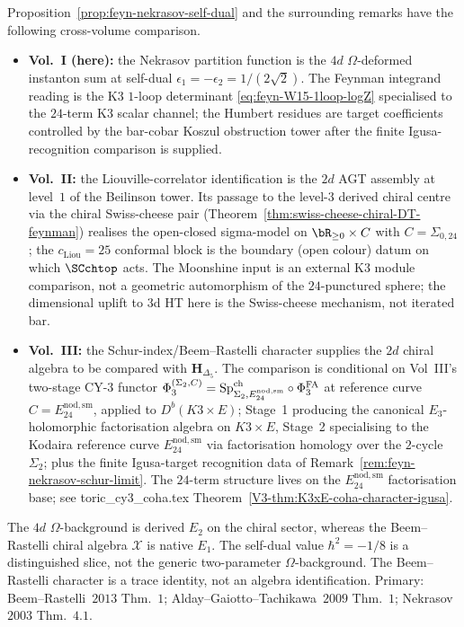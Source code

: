 \begin{remark}
\label{rem:feyn-nekrasov-cross-volume-comparison}
Proposition~\ref{prop:feyn-nekrasov-self-dual} and the
surrounding remarks have the following cross-volume comparison.
\begin{itemize}
\item \textbf{Vol.~I (here):} the Nekrasov partition function
is the $4d$ $\Omega$-deformed instanton sum at self-dual
$\epsilon_1 = -\epsilon_2 = 1/(2\sqrt 2)$. The Feynman
integrand reading is the K3 $1$-loop determinant
\eqref{eq:feyn-W15-1loop-logZ} specialised to the
$24$-term K3 scalar channel; the Humbert residues are target
coefficients controlled by the bar-cobar Koszul obstruction tower
after the finite Igusa-recognition comparison is supplied.
\item \textbf{Vol.~II:} the Liouville-correlator identification is
the $2d$ AGT assembly at level~$1$ of the Beilinson tower.
Its passage to the level-$3$ derived chiral centre via the
chiral Swiss-cheese pair
\textup{(}Theorem~\ref{thm:swiss-cheese-chiral-DT-feynman}\textup{)}
realises the open-closed sigma-model on
$\bR_{\geq 0} \times C$ with $C = \Sigma_{0,24}$; the
$c_{\mathrm{Liou}} = 25$ conformal block is the boundary
\textup{(}open colour\textup{)} datum on which
$\SCchtop$ acts. The Moonshine input is an external K3 module
comparison, not a geometric automorphism of the $24$-punctured
sphere; the dimensional uplift to $3$d HT here is the Swiss-cheese
mechanism, not iterated bar.
\item \textbf{Vol.~III:} the Schur-index/Beem--Rastelli character
supplies the $2d$ chiral algebra to be compared with
$\mathbf H_{\Delta_5}$. The comparison is conditional on Vol~III's
two-stage CY-$3$ functor
$\Phi_3^{(\Sigma_2, C)} =
\mathrm{Sp}^{\mathrm{ch}}_{\Sigma_2, E^{\mathrm{nod, sm}}_{24}} \circ \Phi^{\mathrm{FA}}_3$
at reference curve $C = E^{\mathrm{nod, sm}}_{24}$,
applied to $D^b(K3 \times E)$; Stage~1 producing the canonical
$E_3$-holomorphic factorisation algebra on $K3 \times E$,
Stage~2 specialising to the Kodaira reference curve
$E^{\mathrm{nod, sm}}_{24}$ via factorisation homology over
the $2$-cycle $\Sigma_2$; plus the finite Igusa-target recognition
data of Remark~\ref{rem:feyn-nekrasov-schur-limit}. The $24$-term
structure lives on the $E^{\mathrm{nod, sm}}_{24}$ factorisation
base; see toric\_cy3\_coha.tex
Theorem~\ref{V3-thm:K3xE-coha-character-igusa}.
\end{itemize}
The $4d$ $\Omega$-background is derived $E_2$ on the chiral sector,
whereas the Beem--Rastelli chiral algebra $\mathcal X$ is native
$E_1$.  The self-dual value $\hbar^2=-1/8$ is a distinguished slice,
not the generic two-parameter $\Omega$-background.  The
Beem--Rastelli character is a trace identity, not an algebra
identification.
Primary: Beem--Rastelli~$2013$ Thm.~$1$;
Alday--Gaiotto--Tachikawa~$2009$ Thm.~$1$;
Nekrasov~$2003$ Thm.~$4.1$.
\end{remark}
